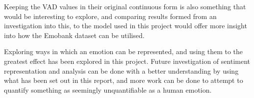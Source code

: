 \documentclass[11pt]{article}
\begin{document}
Keeping the VAD values in their original continuous form is also something that would be interesting to explore, and comparing results formed from an investigation into this, to the model used in this project would offer more insight into how the Emobank dataset can be utilised.

Exploring ways in which an emotion can be represented, and using them to the greatest effect has been explored in this project. Future investigation of sentiment representation and analysis can be done with a better understanding by using what has been set out in this report, and more work can be done to attempt to quantify something as seemingly unquantifiable as a human emotion.

\pagebreak






\end{document}
